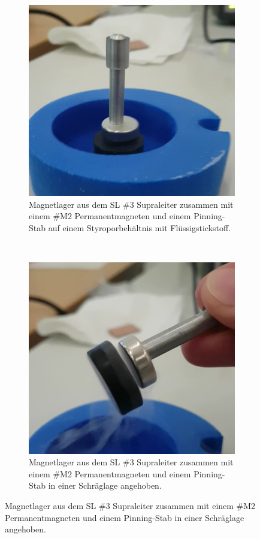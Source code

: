 \begin{figure}[H]
\centering
	\begin{subfigure}[t]{0.45\textwidth}
    \includegraphics[width=\textwidth]{Auswertung/SL_3.jpg}
    \caption{Magnetlager aus dem SL \#3 Supraleiter zusammen mit einem
    \#M2 Permanentmagneten und einem Pinning-Stab auf einem Styroporbehältnis mit
    Flüssigstickstoff.}
    \label{fig:SL3}
	\end{subfigure}
	~
	\begin{subfigure}[t]{0.45\textwidth}
    \includegraphics[width=\textwidth]{Auswertung/SL_4.jpg}
    \caption{Magnetlager aus dem SL \#3 Supraleiter zusammen mit einem
    \#M2 Permanentmagneten und einem Pinning-Stab in einer Schräglage angehoben.}
    \label{fig:SL4}
	\end{subfigure}
\end{figure}

